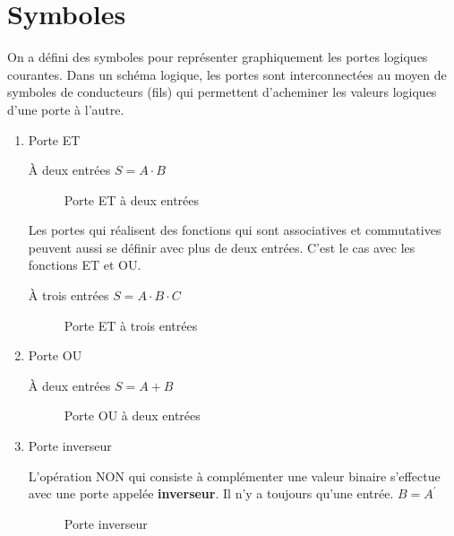 \documentclass[letter, oneside]{book}
\begin{document}
\section{Symboles}
\label{sec:org19b1a9f}

On a défini des symboles pour représenter graphiquement les portes
logiques courantes. Dans un schéma logique, les portes sont
interconnectées au moyen de symboles de conducteurs
(fils) qui permettent d'acheminer les valeurs logiques d'une porte à
l'autre.

\begin{enumerate}
\item Porte ET
\label{sec:org9479165}

À deux entrées \(S =  A \cdot B\)

\begin{figure}[htbp]
\centering

\caption{\label{fig:org8d8bc74}Porte ET à deux entrées}
\end{figure}

Les portes qui réalisent des fonctions qui sont associatives et
commutatives peuvent aussi se définir avec plus de deux entrées. C'est
le cas avec les fonctions ET et OU.

À trois entrées \(S =  A \cdot B \cdot C\)

\begin{figure}[htbp]
\centering

\caption{\label{fig:orgb87ab98}Porte ET à trois entrées}
\end{figure}

\item Porte OU
\label{sec:org3678dce}

À deux entrées \(S =  A + B\)

\begin{figure}[htbp]
\centering

\caption{\label{fig:org1bfc837}Porte OU à deux entrées}
\end{figure}

\item Porte inverseur
\label{sec:org8eed6df}

L'opération NON qui consiste à complémenter une valeur binaire
s'effectue avec une porte appelée \textbf{inverseur}.  Il n'y a toujours
qu'une entrée. \(B = A^\prime\)

\begin{figure}[htbp]
\centering

\caption{\label{fig:orgd19359a}Porte inverseur}
\end{figure} 


\end{enumerate}
\end{document}
